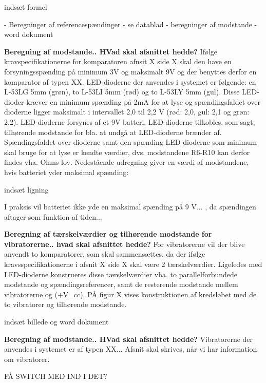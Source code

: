 indsæt formel

- Beregninger af referencespændinger - se datablad
- beregninger af modstande
- word dokument

\textbf{Beregning af modstande.. HVad skal afsnittet hedde?}
Ifølge kravspecifikationerne for komparatoren afnsit X side X skal den have en forsyningsspænding på minimum 3V og maksimalt 9V og der benyttes derfor en komparator af typen XX. LED-dioderne der anvendes i systemet er følgende: en L-53LG 5mm (grøn), to L-53LI 5mm (rød) og to L-53LY 5mm (gul). Disse LED-dioder kræver en minimum spænding på 2mA for at lyse og spændingsfaldet over dioderne ligger maksimalt i intervallet 2,0 til 2,2 V (rød: 2,0, gul: 2,1 og grøn: 2,2). LED-dioderne forsynes af et 9V batteri. LED-dioderne tilkobles, som sagt, tilhørende modstande for bla. at undgå at LED-dioderne brænder af. Spændingsfaldet over dioderne samt den spænding LED-dioderne som minimum skal bruge for at lyse er kendte værdier, dvs. modstandene R6-R10 kan derfor findes vha. Ohms lov. Nedestående udregning giver en værdi af modstandene, hvis batteriet yder maksimal spænding:

indsæt ligning 

I praksis vil batteriet ikke yde en maksimal spænding på 9 V... , da spændingen aftager som funktion af tiden... 

\textbf{Beregning af tærskelværdier og tilhørende modstande for vibratorerne.. hvad skal afsnittet hedde?}
For vibratorerne vil der blive anvendt to komparatorer, som skal sammensættes, da der ifølge kravsspecifikationerne i afsnit X side X skal være 2 tærskelværdier. Ligeledes med LED-dioderne konstrueres disse tærskelværdier vha. to parallelforbundede modstande og spændingsreferencer, samt de resterende modstande mellem vibratorerne og (+V_{cc}). PÅ figur X vises konstruktionen af kredsløbet med de to vibratorer og tilhørende modstande.

indsæt billede og word dokument

\textbf{Beregning af modstande.. HVad skal afsnittet hedde?}
Vibratorerne der anvendes i systemet er af typen XX... Afsnit skal skrives, når vi har information om vibratorer. 


FÅ SWITCH MED IND I DET? 
